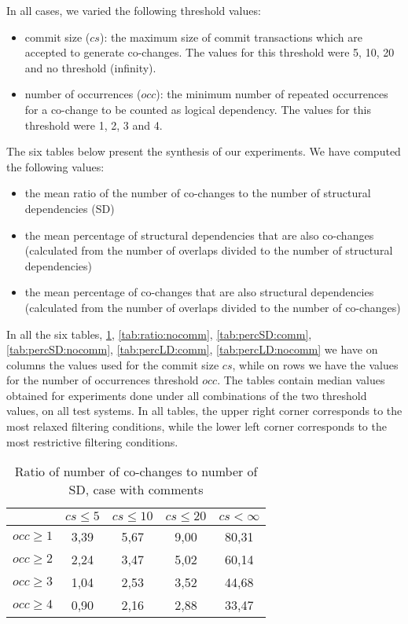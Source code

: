 In all cases, we varied the following threshold values: 
 \begin{itemize}
	\item commit size ($cs$): the maximum size of commit transactions which are accepted to generate co-changes. The values for this threshold were 5, 10, 20 and no threshold (infinity).  
	\item number of occurrences ($occ$): the minimum number of repeated occurrences for a co-change to be counted as logical dependency. The values for this threshold were 1, 2, 3 and 4.  
\end{itemize}

The six tables below present the synthesis of our experiments. 
We have computed the following  values:
\begin{itemize}
	\item the mean ratio of the number of co-changes to the number of structural dependencies (SD)
   	\item the mean percentage of structural dependencies that are also co-changes (calculated from the number of overlaps divided to the number of structural dependencies)	
	\item the mean percentage of co-changes that are also structural dependencies (calculated from the number of overlaps divided to the number of co-changes)
\end{itemize}

In all the six tables, \ref{tab:ratio:comm}, \ref{tab:ratio:nocomm}, \ref{tab:percSD:comm}, \ref{tab:percSD:nocomm},
\ref{tab:percLD:comm}, \ref{tab:percLD:nocomm} we have on columns the values used for the commit size $cs$, while on rows we have the values for the number of occurrences threshold $occ$. The tables contain median values obtained for experiments done under all combinations of the two threshold values, on all test systems. In all tables, the upper right corner corresponds to the most relaxed filtering conditions, while the lower left corner corresponds to the most restrictive filtering conditions.

\begin{table}[!h]
\renewcommand{\arraystretch}{1}
\caption{Ratio of number of co-changes to number of SD, case with comments}
\label{tab:ratio:comm}
\centering

\begin{tabular}{|c|c|c|c|c|}
\hline
	      &	$cs\leq 5$	&	$cs\leq 10$	&	$cs\leq 20$	&	$cs<\infty$	\\
\hline
$occ\geq 1$	&	3,39	&	5,67	&	9,00	&	80,31	\\
$occ\geq 2$	&	2,24	&	3,47	&	5,02	&	60,14	\\
$occ\geq 3$	&	1,04	&	2,53	&	3,52	&	44,68	\\
$occ\geq 4$	&	0,90	&	2,16	&	2,88	&	33,47	\\
\hline
\end{tabular}
\end{table}

